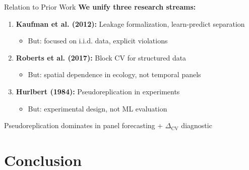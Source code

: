 \documentclass[aspectratio=169]{beamer}
\begin{document}
\begin{frame}{Relation to Prior Work}
\textbf{We unify three research streams:}

\vspace{0.5em}
\begin{enumerate}
\item \textbf{Kaufman et al. (2012):} Leakage formalization, learn-predict separation
\begin{itemize}
\item But: focused on i.i.d. data, explicit violations
\end{itemize}

\vspace{0.3em}
\item \textbf{Roberts et al. (2017):} Block CV for structured data
\begin{itemize}
\item But: spatial dependence in ecology, not temporal panels
\end{itemize}

\vspace{0.3em}
\item \textbf{Hurlbert (1984):} Pseudoreplication in experiments
\begin{itemize}
\item But: experimental design, not ML evaluation
\end{itemize}
\end{enumerate}

\vspace{1em}
 Pseudoreplication \alert{dominates} in panel forecasting + $\Delta_{\text{CV}}$ diagnostic
\end{frame}

\section{Conclusion}
\end{document}
